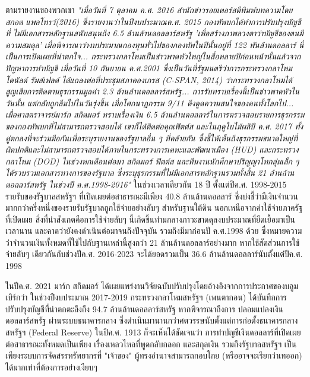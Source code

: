 \documentclass[10pt,twocolumn,letterpaper]{article}
\begin{document}
ตามรายงานของพวกเขา \textit{"เมื่อวันที่ 7 ตุลาคม ค.ศ. 2016 สำนักข่าวรอยเตอร์สตีพิมพ์บทความโดยสกอต แพลโทรว์(2016) ซึ่งรายงานว่าในปีงบประมาณค.ศ.  2015  กองทัพบกได้ทำการปรับปรุงบัญชีที่ ไม่มีเอกสารหลักฐานสนับสนุนถึง 6.5 ล้านล้านดอลลาร์สหรัฐ 'เพื่อสร้างภาพลวงตาว่าบัญชีของตนมีความสมดุล' เมื่อพิจารณาว่างบประมาณกองทุนทั่วไปของกองทัพในปีนั้นอยู่ที่ 122 พันล้านดอลลาร์ นี่เป็นการเปิดเผยที่น่าตกใจ... กระทรวงกลาโหมเป็นข่าวพาดหัวใหญ่ในสื่อหลายปีก่อนหน้านั้นแล้วจากปัญหาการทำบัญชี เมื่อวันที่ 10 กันยายน ค.ศ.2001 ซึ่งเป็นวันที่รัฐมนตรีว่าการกระทรวงกลาโหม โดนัลด์ รัมส์เฟลด์ ได้แถลงต่อที่ประชุมสภาคองเกรส (C-SPAN, 2014) ว่ากระทรวงกลาโหมได้ สูญเสียการติดตามธุรกรรมมูลค่า 2.3 ล้านล้านดอลลาร์สหรัฐ... การรับทราบเรื่องนี้เป็นข่าวพาดหัวในวันนั้น แต่กลับถูกลืมไปในวันรุ่งขึ้น เมื่อโศกนาฏกรรม 9/11 ดึงดูดความสนใจของคนทั้งโลกไป... เมื่อศาสตราจารย์มาร์ก สกิดมอร์ ทราบเรื่องเงิน 6.5 ล้านล้านดอลลาร์ในการตรวจสอบรายการธุรกรรมของกองทัพบกที่ไม่สามารถตรวจสอบได้ เขาก็ได้ติดต่อคุณฟิตต์ส และในฤดูใบไม้ผลิปี ค.ศ. 2017 ทั้งคู่ตกลงที่จะร่วมมือกันเพื่อระบุรายงานของรัฐบาลอื่น ๆ ที่คล้ายกัน ซึ่งชี้ให้เห็นถึงธุรกรรมขนาดใหญ่ที่ผิดปกติและไม่สามารถตรวจสอบได้ภายในกระทรวงการเคหะและพัฒนาเมือง (HUD) และกระทรวงกลาโหม (DOD)
ในช่วงหกเดือนต่อมา สกิดมอร์ ฟิตต์ส และทีมงานนักศึกษาปริญญาโทกลุ่มเล็ก ๆ ได้รวบรวมเอกสารทางการของรัฐบาล ซึ่งระบุธุรกรรมที่ไม่มีเอกสารหลักฐานรวมทั้งสิ้น 21 ล้านล้านดอลลาร์สหรัฐ ในช่วงปี ค.ศ.1998-2016"} \cite{12}
ในช่วงเวลาเดียวกัน 18 ปี ตั้งแต่ปีค.ศ. 1998-2015 รายรับของรัฐบาลสหรัฐฯ ที่เปิดเผยต่อสาธารณะมีเพียง 40.8 ล้านล้านดอลลาร์ \cite{15} ซึ่งบ่งชี้ว่ามีเงินจำนวนมากกว่าครึ่งหนึ่งของรายรับรัฐบาลถูกใช้จ่ายอย่างลับๆ สำหรับฐานใต้ดิน นอกเหนือจากค่าใช้จ่ายภาครัฐที่เปิดเผย สิ่งที่น่าสังเกตคือการใช้จ่ายลับๆ นี้เกิดขึ้นท่ามกลางภาวะขาดดุลงบประมาณที่ยืดเยื้อมาเป็นเวลานาน และคาดว่ายังคงดำเนินต่อมาจนถึงปัจจุบัน รวมถึงมีมาก่อนปี ค.ศ.1998 ด้วย ซึ่งหมายความว่าจำนวนเงินทั้งหมดที่ใช้ไปกับฐานเหล่านี้สูงกว่า 21 ล้านล้านดอลลาร์อย่างมาก หากใช้สัดส่วนการใช้จ่ายลับๆ เดียวกันกับช่วงปีค.ศ. 2016-2023 จะได้ยอดรวมเป็น 36.6 ล้านล้านดอลลาร์นับตั้งแต่ปีค.ศ. 1998

ในปีค.ศ. 2021 มาร์ก สกิดมอร์ ได้เผยแพร่งานวิจัยฉบับปรับปรุงโดยอ้างอิงจากการประกาศของบลูมเบิร์กว่า ในช่วงปีงบประมาณ 2017-2019 กระทรวงกลาโหมสหรัฐฯ (เพนตากอน) ได้บันทึกการปรับปรุงบัญชีที่น่าตกตะลึงถึง 94.7 ล้านล้านดอลลาร์สหรัฐ \cite{17,18} หากพิจารณาถึงการ ปลอมแปลงเงินดอลลาร์สหรัฐ ผ่านระบบธนาคารกลาง ซึ่งดำเนินมานานกว่าศตวรรษนับตั้งแต่การก่อตั้งธนาคารกลางสหรัฐฯ (Federal Reserve) ในปีค.ศ. 1913  \cite{37} ก็จะเห็นได้ชัดเจนว่า การทำบัญชีเงินดอลลาร์ที่เปิดเผยต่อสาธารณะทั้งหมดเป็นเพียง เรื่องเหลวไหลที่พูดกลับกลอก และสกุลเงิน รวมถึงรัฐบาลสหรัฐฯ เป็นเพียงระบบการจัดสรรทรัพยากรที่ "เจ้าของ" ผู้ทรงอำนาจสามารถกอบโกย (หรืออาจจะเรียกว่าเทออก) ได้มากเท่าที่ต้องการอย่างเงียบๆ
\end{document}
